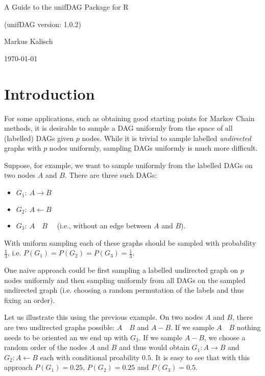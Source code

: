 \documentclass[11pt]{article}\usepackage[]{graphicx}\usepackage[]{color}
\begin{document}
\begin{center}
{\LARGE A Guide to the unifDAG Package for R}

{\Large (unifDAG version: 1.0.2) }

\bigskip
{\large Markus Kalisch}

\bigskip

\today

\end{center}


\tableofcontents





\section{Introduction}
For some applications, such as obtaining good starting points for Markov
Chain methods, it is desirable to sample a DAG uniformly from
the space of all (labelled) DAGs given $p$ nodes. While it is trivial to
sample labelled \emph{undirected} graphs with $p$ nodes uniformly, sampling
DAGs uniformly is much more difficult.

Suppose, for example, we want to sample uniformly from the labelled DAGs on two nodes $A$ and $B$. There are three such DAGs:

\begin{itemize}
\item $G_1: \ A \to B$
\item $G_2: \ A \leftarrow B$
\item $G_3: \ A \quad B\quad$ (i.e., without an edge between $A$ and $B$).
\end{itemize}

With uniform sampling each of these graphs should be sampled with probability $\frac{1}{3}$, i.e. $P(G_1) = P(G_2) = P(G_3) = \frac{1}{3}$.

One naive approach could be first sampling a labelled undirected graph on $p$ nodes uniformly and then sampling uniformly from all DAGs on the sampled undirected graph (i.e. choosing a random permutation of the labels and thus fixing an order).

Let us illustrate this using the previous example. On two nodes $A$ and $B$, there are two undirected graphs possible: $A \quad B$ and $A - B$. If we sample $A \quad B$ nothing needs to be oriented an we end up with $G_3$. If we sample $A - B$, we choose a random order of the nodes $A$ and $B$ and thus would obtain $G_1: A \to B$ and $G_2: A \leftarrow B$ each with conditional proability $0.5$. It is easy to see that with this approach $P(G_1)=0.25$, $P(G_2)=0.25$ and $P(G_3)=0.5$.
\end{document}
